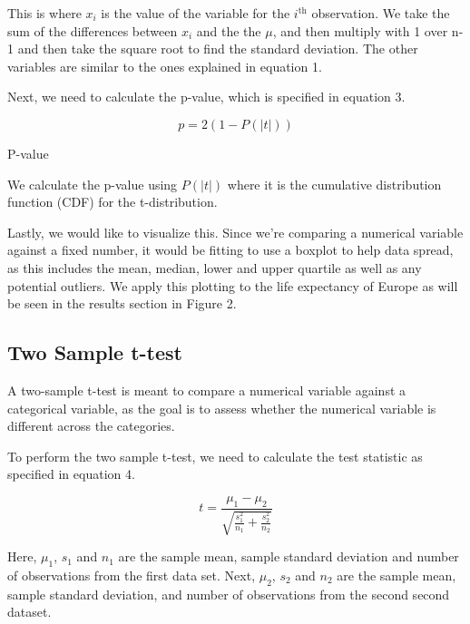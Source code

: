 \documentclass[a4paper, twocolumn]{article}
\begin{document}
This is where $x_i$ is the value of the variable for the $i^{\text{th}}$ observation. We take the sum of the
differences between $x_i$ and the the $\mu$, and then multiply with 1 over n-1 and then take the square root 
to find the standard deviation. The other variables are similar to the ones explained in equation 1. 

Next, we need to calculate the p-value, which is specified in equation 3.

\begin{equation}
    p = 2(1 - P(|t|))
    \label{eq:p-value}
    \end{equation}
    
    \begin{center}
    P-value
    \end{center}

We calculate the p-value using $P ( \left| t \right|)$ where it is the cumulative distribution function (CDF) for
the t-distribution. 

Lastly, we would like to visualize this. Since we're comparing a numerical variable against a fixed number, it would
be fitting to use a boxplot to help data spread, as this includes the mean, median, lower and upper quartile as well
as any potential outliers. We apply this plotting to the life expectancy of Europe as will be seen in the results
section in Figure 2.

\subsection{Two Sample t-test}
A two-sample t-test is meant to compare a numerical variable against a categorical variable, as the goal is to assess
whether the numerical variable is different across the categories. 

To perform the two sample t-test, we need to calculate the test statistic as specified in equation 4.

\begin{equation}
    t = \frac{\mu_1 - \mu_2}{\sqrt{\frac{s_1^2}{n_1} + \frac{s_2^2}{n_2}}}
    \label{eq:t-test}
\end{equation}
\begin{center}
\end{center}

Here, $\mu_1$, $s_1$ and $n_1$ are the sample mean, sample standard deviation and number of observations from the 
first data set. Next, $\mu_2$, $s_2$ and $n_2$ are the sample mean, sample standard deviation, and number of 
observations from the second second dataset. 
\end{document}
